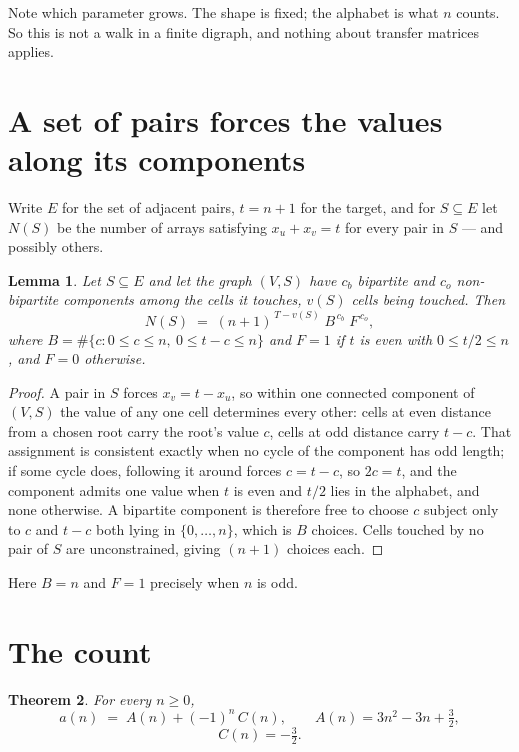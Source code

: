 \documentclass[11pt,a4paper]{article}
\theoremstyle{plain}
\newtheorem{theorem}{Theorem}
\newtheorem{lemma}[theorem]{Lemma}
\theoremstyle{definition}
\begin{document}
Note which parameter grows. The shape is fixed; the alphabet is what $n$ counts. So this is not
a walk in a finite digraph, and nothing about transfer matrices applies.

\section{A set of pairs forces the values along its components}

Write $E$ for the set of adjacent pairs, $t=n+1$ for the target, and for $S\subseteq E$ let
$N(S)$ be the number of arrays satisfying $x_u+x_v=t$ for every pair in $S$ --- and possibly
others.

\begin{lemma}\label{lem:comp}
Let $S\subseteq E$ and let the graph $(V,S)$ have $c_b$ bipartite and $c_o$ non-bipartite
components among the cells it touches, $v(S)$ cells being touched. Then
\[
N(S)\;=\;(n+1)^{\,T-v(S)}\;B^{\,c_b}\;F^{\,c_o},
\]
where $B=\#\{c: 0\le c\le n,\ 0\le t-c\le n\}$ and $F=1$ if $t$ is even with $0\le t/2\le n$,
and $F=0$ otherwise.
\end{lemma}

\begin{proof}
A pair in $S$ forces $x_v=t-x_u$, so within one connected component of $(V,S)$ the value of any
one cell determines every other: cells at even distance from a chosen root carry the root's
value $c$, cells at odd distance carry $t-c$. That assignment is consistent exactly when no
cycle of the component has odd length; if some cycle does, following it around forces $c=t-c$,
so $2c=t$, and the component admits one value when $t$ is even and $t/2$ lies in the alphabet,
and none otherwise. A bipartite component is therefore free to choose $c$ subject only to
$c$ and $t-c$ both lying in $\{0,\dots,n\}$, which is $B$ choices. Cells touched by no pair
of $S$ are unconstrained, giving $(n+1)$ choices each.
\end{proof}

Here $B=n$ and $F=1$ precisely when $n$ is odd.

\section{The count}

\begin{theorem}\label{thm:quasi}
For every $n\ge0$,
\[
a(n)\;=\;A(n)+(-1)^n\,C(n),\qquad
A(n)=3n^{2} - 3n + \tfrac{3}{2},
\]
\[
C(n)=- \tfrac{3}{2}.
\]
\end{theorem}
\end{document}
